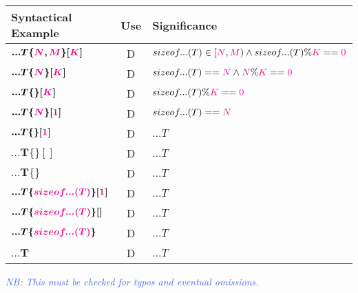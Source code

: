 \begin{tabularx}{\textwidth}{l|c|X}
  \textbf{Syntactical Example} & \textbf{Use}  &\textbf{Significance} \\
\hline
$\bm{...T\{\textcolor{Magenta}{\textcolor{Magenta}{N}},\textcolor{Magenta}{M}\}[\textcolor{Magenta}{K}]}$ & D & $sizeof...(T) \in [\textcolor{Magenta}{N},\textcolor{Magenta}{M}) \wedge{} sizeof...(T) \% \textcolor{Magenta}{K} == \textcolor{Magenta}{0}$ \\
$\bm{...T\{\textcolor{Magenta}{N}\}[\textcolor{Magenta}{K}]}$ & D & $sizeof...(T) == \textcolor{Magenta}{N} \wedge{} \textcolor{Magenta}{N} \% \textcolor{Magenta}{K} == \textcolor{Magenta}{0}$ \\
$\bm{...T\{\}[\textcolor{Magenta}{K}]}$ & D & $sizeof...(T) \% \textcolor{Magenta}{K} == \textcolor{Magenta}{0}$ \\
$\bm{...T\{\textcolor{Magenta}{N}\}[\textcolor{Magenta}{1}]}$ & D & $sizeof...(T) == \textcolor{Magenta}{N}$ \\
$\bm{...T\{\}[\textcolor{Magenta}{1}]}$ & D & $...T$ \\
$\bm{...T\{\}[]}$ & D & $...T$ \\
$\bm{...T\{\}}$ & D &$...T$ \\
$\bm{...T\{\textcolor{Magenta}{sizeof...(T)}\}[\textcolor{Magenta}{1}]}$ & D & $...T$ \\
$\bm{...T\{\textcolor{Magenta}{sizeof...(T)}\}[]}$ & D &  $...T$ \\
$\bm{...T\{\textcolor{Magenta}{sizeof...(T)}\}}$ & D & $...T$ \\
$\bm{...T}$ & D & $...T$ \\
\end{tabularx}

\textcolor{RoyalBlue}{\textit{NB: This must be checked for typos and eventual omissions.}}

